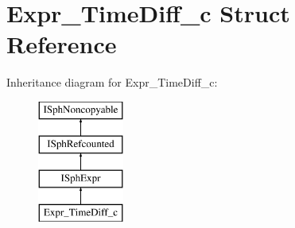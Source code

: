 \hypertarget{structExpr__TimeDiff__c}{\section{Expr\-\_\-\-Time\-Diff\-\_\-c Struct Reference}
\label{structExpr__TimeDiff__c}
}
Inheritance diagram for Expr\-\_\-\-Time\-Diff\-\_\-c\-:\begin{figure}[H]
\begin{center}
\leavevmode
\includegraphics[height=4.000000cm]{structExpr__TimeDiff__c}
\end{center}
\end{figure}
